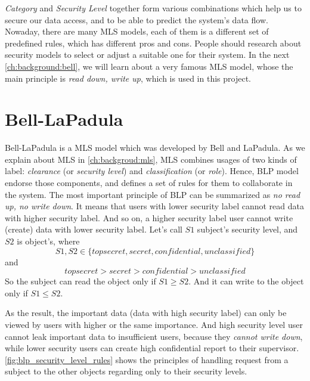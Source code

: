 \emph{Category} and \emph{Security Level} together form various combinations which help us to secure our data access, and to be able to predict the system's data flow.
Nowaday, there are many MLS models, each of them is a different set of predefined rules, which has different pros and cons.
People should research about security models to select or adjust a suitable one for their system. In the next \autoref{ch:background:bell}, we will learn about a very famous MLS model, whose the main principle is \emph{read down, write up}, which is used in this project.


\section{Bell-LaPadula}
\label{ch:background:bell}

Bell-LaPadula is a MLS model which was developed by Bell and LaPadula.
As we explain about MLS in \autoref{ch:backgroud:mls}, MLS combines usages of two kinds of label: \emph{clearance} (or \emph{security level}) and \emph{classification} (or \emph{role}).
Hence, BLP model endorse those components, and defines a set of rules for them to collaborate in the system.
The most important principle of BLP can be summarized as \emph{no read up, no write down}.
It means that users with lower security label cannot read data with higher security label.
And so on, a higher security label user cannot write (create) data with lower security label.
Let's call $S1$ subject's security level, and $S2$ is object's, where 
$$S1,S2 \in \{top secret, secret, confidential, unclassified\}$$ 
and 
$$top secret > secret > confidential > unclassified$$
So the subject can read the object only if $S1 \geq S2$.
And it can write to the object only if $S1 \leq S2$.

As the result, the important data (data with high security label) can only be viewed by users with higher or the same importance.
And high security level user cannot leak important data to insufficient users, because they \emph{cannot write down}, while lower security users can create high confidential report to their supervisor. 
\autoref{fig:blp_security_level_rules} shows the principles of handling request from a subject to the other objects regarding only to their security levels.

